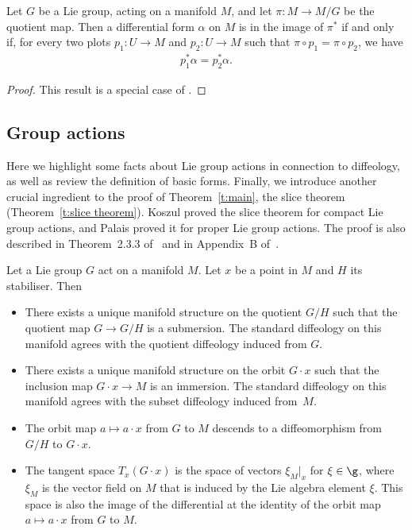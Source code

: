 \begin{Proposition}\label{p:pullbackimgchar}
Let $G$ be a Lie group, acting on a manifold $M$,
and let $\pi \colon M \to M/G$ be the quotient map.
Then a differential form $\alpha$ on $M$ is in the image of $\pi^*$
if and only if, for every two plots $p_1 \colon U\to M$
and $p_2 \colon U \to M$ such that $\pi \circ p_1 = \pi \circ p_2$, we have
\begin{gather*} p_1^* \alpha = p_2^* \alpha. \end{gather*}
\end{Proposition}

\begin{proof}
This result is a special case of \cite[Section~6.38]{iglesias}.
\end{proof}

\subsection*{Group actions}

Here we highlight some facts about Lie group actions in connection to dif\/feology, as well as review the def\/inition of basic forms. Finally, we introduce another crucial ingredient to the proof of Theorem~\ref{t:main}, the slice theorem (Theorem~\ref{t:slice theorem}). Koszul \cite{koszul} proved the slice theorem for compact Lie group actions, and
Palais \cite{palais} proved it for proper Lie group actions.
The proof is also described in Theorem~2.3.3 of~\cite{DK}
and in Appendix~B of~\cite{GGK}.

\begin{Lemma} \label{facts}
Let a Lie group $G$ act on a manifold $M$.
Let $x$ be a point in $M$ and $H$ its stabiliser. Then
\begin{itemize}\itemsep=0pt
\item
There exists a unique manifold structure on the quotient $G/H$
such that the quotient map $G \to G/H$ is a submersion.
The standard diffeology on this manifold
agrees with the quotient diffeology induced from $G$.

\item
There exists a unique manifold structure on the orbit $G \cdot x$
such that the inclusion map $G \cdot x \to M$ is an immersion.
The standard diffeology on this manifold agrees with the subset diffeology
induced from~$M$.

\item
The orbit map $a \mapsto a \cdot x$ from $G$ to $M$
descends to a diffeomorphism from $G/H$ to $G \cdot x$.

\item
The tangent space $T_x(G \cdot x)$
is the space of vectors $\xi_M|_x$ for $\xi \in \g$,
where $\xi_M$ is the vector field on $M$ that is induced
by the Lie algebra element $\xi$.
This space is also the image of the differential at the identity
of the orbit map $a \mapsto a \cdot x$ from $G$ to $M$.
\end{itemize}
\end{Lemma}

